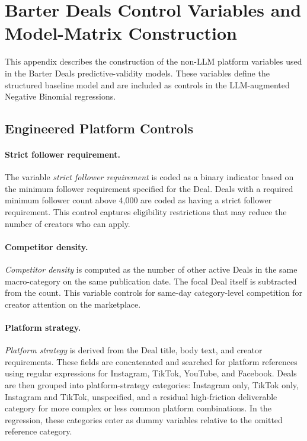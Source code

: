 \section{Barter Deals Control Variables and Model-Matrix Construction}
\label{app:barter_control_variables}

This appendix describes the construction of the non-LLM platform variables used in the Barter Deals predictive-validity models. These variables define the structured baseline model and are included as controls in the LLM-augmented Negative Binomial regressions.

\subsection{Engineered Platform Controls}

\paragraph{Strict follower requirement.}
The variable \textit{strict follower requirement} is coded as a binary indicator based on the minimum follower requirement specified for the Deal. Deals with a required minimum follower count above 4{,}000 are coded as having a strict follower requirement. This control captures eligibility restrictions that may reduce the number of creators who can apply.

\paragraph{Competitor density.}
\textit{Competitor density} is computed as the number of other active Deals in the same macro-category on the same publication date. The focal Deal itself is subtracted from the count. This variable controls for same-day category-level competition for creator attention on the marketplace.

\paragraph{Platform strategy.}
\textit{Platform strategy} is derived from the Deal title, body text, and creator requirements. These fields are concatenated and searched for platform references using regular expressions for Instagram, TikTok, YouTube, and Facebook. Deals are then grouped into platform-strategy categories: Instagram only, TikTok only, Instagram and TikTok, unspecified, and a residual high-friction deliverable category for more complex or less common platform combinations. In the regression, these categories enter as dummy variables relative to the omitted reference category.

